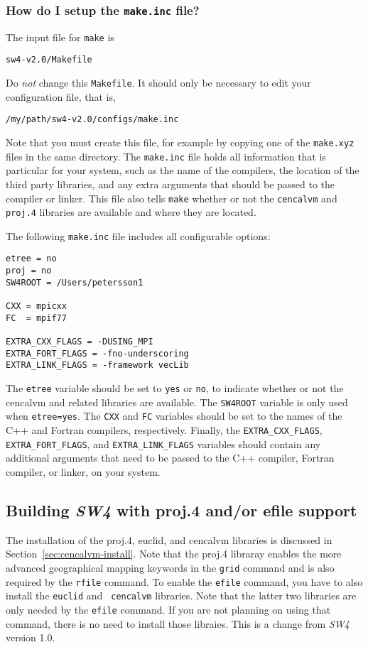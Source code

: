 \documentclass[11pt]{article}
\begin{document}
\subsubsection{How do I setup the {\tt make.inc} file?}

The input file for \verb+make+ is
\begin{verbatim}
sw4-v2.0/Makefile
\end{verbatim}
Do {\em not} change this \verb+Makefile+. It should only be necessary to edit your configuration
file, that is,
\begin{verbatim}
/my/path/sw4-v2.0/configs/make.inc
\end{verbatim}
Note that you must create this file, for example by copying one of the \verb+make.xyz+ files in the
same directory. The \verb+make.inc+ file holds all information that is particular for your system,
such as the name of the compilers, the location of the third party libraries, and any extra
arguments that should be passed to the compiler or linker. This file also tells \verb+make+ whether
or not the \verb+cencalvm+ and \verb+proj.4+ libraries are available and where they are located.

The following \verb+make.inc+ file includes all configurable options:
\begin{verbatim}
etree = no
proj = no
SW4ROOT = /Users/petersson1

CXX = mpicxx
FC  = mpif77

EXTRA_CXX_FLAGS = -DUSING_MPI
EXTRA_FORT_FLAGS = -fno-underscoring
EXTRA_LINK_FLAGS = -framework vecLib
\end{verbatim}
The \verb+etree+ variable should be set to \verb+yes+ or \verb+no+, to indicate whether or not the
cencalvm and related libraries are available. The \verb+SW4ROOT+ variable is only used when
\verb+etree=yes+. The \verb+CXX+ and \verb+FC+ variables should be set to the names of the C++ and
Fortran compilers, respectively. Finally, the \verb+EXTRA_CXX_FLAGS+, \verb+EXTRA_FORT_FLAGS+, and
\verb+EXTRA_LINK_FLAGS+ variables should contain any additional arguments that need to be passed to
the C++ compiler, Fortran compiler, or linker, on your system.

\subsection{Building \emph{SW4} with proj.4 and/or efile support}
The installation of the proj.4, euclid, and cencalvm libraries is discussed in
Section~\ref{sec:cencalvm-install}. Note that the proj.4 libraray enables the more advanced
geographical mapping keywords in the {\tt grid} command and is also required by the {\tt rfile}
command. To enable the {\tt efile} command, you have to also install the {\tt euclid} and {\tt
  cencalvm} libraries. Note that the latter two libraries are only needed by the {\tt efile}
command. If you are not planning on using that command, there is no need to install those
libraies. This is a change from \emph{SW4} version 1.0.
\end{document}

